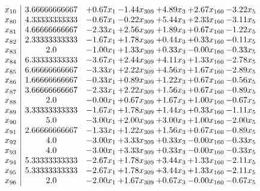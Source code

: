 \documentclass[8pt]{article}
\begin{document}
\[\begin{array}{c| c c@{\hskip 2pt} c@{\hskip 2pt} c@{\hskip 2pt} c@{\hskip 2pt} c@{\hskip 2pt} }
 x_{10}   &  3.66666666667 & +  0.67 x_{1} & -1.44 x_{309} & +  4.89 x_{3} & +  2.67 x_{160} & -3.22 x_{5}\\
 x_{80}   &  4.33333333333 & -0.67 x_{1} & -0.22 x_{309} & +  5.44 x_{3} & +  2.33 x_{160} & -3.11 x_{5}\\
 x_{81}   &  4.66666666667 & -2.33 x_{1} & +  2.56 x_{309} & +  1.89 x_{3} & +  0.67 x_{160} & -1.22 x_{5}\\
 x_{82}   &  2.33333333333 & -1.67 x_{1} & +  1.78 x_{309} & +  0.44 x_{3} & +  0.33 x_{160} & -0.11 x_{5}\\
 x_{83}   &  2.0 & -1.00 x_{1} & +  1.33 x_{309} & +  0.33 x_{3} & -0.00 x_{160} & -0.33 x_{5}\\
 x_{84}   &  6.33333333333 & -3.67 x_{1} & +  2.44 x_{309} & +  4.11 x_{3} & +  1.33 x_{160} & -2.78 x_{5}\\
 x_{85}   &  6.66666666667 & -3.33 x_{1} & +  2.22 x_{309} & +  4.56 x_{3} & +  1.67 x_{160} & -2.89 x_{5}\\
 x_{86}   &  1.66666666667 & -0.33 x_{1} & +  0.89 x_{309} & +  1.22 x_{3} & +  0.67 x_{160} & -0.56 x_{5}\\
 x_{87}   &  3.66666666667 & -2.33 x_{1} & +  2.22 x_{309} & +  1.56 x_{3} & +  0.67 x_{160} & -0.89 x_{5}\\
 x_{88}   &  2.0 & -0.00 x_{1} & +  0.67 x_{309} & +  1.67 x_{3} & +  1.00 x_{160} & -0.67 x_{5}\\
 x_{89}   &  3.33333333333 & -1.67 x_{1} & +  1.78 x_{309} & +  1.44 x_{3} & +  0.33 x_{160} & -1.11 x_{5}\\
 x_{90}   &  5.0 & -3.00 x_{1} & +  2.00 x_{309} & +  3.00 x_{3} & +  1.00 x_{160} & -2.00 x_{5}\\
 x_{91}   &  2.66666666667 & -1.33 x_{1} & +  1.22 x_{309} & +  1.56 x_{3} & +  0.67 x_{160} & -0.89 x_{5}\\
 x_{92}   &  4.0 & -3.00 x_{1} & +  3.33 x_{309} & +  0.33 x_{3} & -0.00 x_{160} & -0.33 x_{5}\\
 x_{93}   &  4.0 & -3.00 x_{1} & +  3.33 x_{309} & +  0.33 x_{3} & -0.00 x_{160} & -0.33 x_{5}\\
 x_{94}   &  5.33333333333 & -2.67 x_{1} & +  1.78 x_{309} & +  3.44 x_{3} & +  1.33 x_{160} & -2.11 x_{5}\\
 x_{95}   &  5.33333333333 & -2.67 x_{1} & +  1.78 x_{309} & +  3.44 x_{3} & +  1.33 x_{160} & -2.11 x_{5}\\
 x_{96}   &  2.0 & -2.00 x_{1} & +  1.67 x_{309} & +  0.67 x_{3} & -0.00 x_{160} & -0.67 x_{5}\\

\end{array}\]
\end{document}
